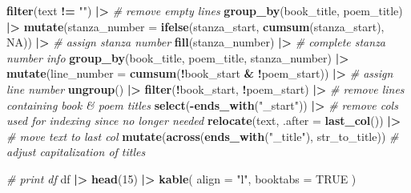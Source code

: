 \documentclass[
]{article}
\newenvironment{Shaded}{\begin{snugshade}}{\end{snugshade}}
\newcommand{\AttributeTok}[1]{\textcolor[rgb]{0.13,0.29,0.53}{#1}}
\newcommand{\CommentTok}[1]{\textcolor[rgb]{0.56,0.35,0.01}{\textit{#1}}}
\newcommand{\ConstantTok}[1]{\textcolor[rgb]{0.56,0.35,0.01}{#1}}
\newcommand{\DecValTok}[1]{\textcolor[rgb]{0.00,0.00,0.81}{#1}}
\newcommand{\FunctionTok}[1]{\textcolor[rgb]{0.13,0.29,0.53}{\textbf{#1}}}
\newcommand{\NormalTok}[1]{#1}
\newcommand{\SpecialCharTok}[1]{\textcolor[rgb]{0.81,0.36,0.00}{\textbf{#1}}}
\newcommand{\StringTok}[1]{\textcolor[rgb]{0.31,0.60,0.02}{#1}}
\begin{document}
\begin{Shaded}
\begin{Highlighting}[]
  \FunctionTok{filter}\NormalTok{(text }\SpecialCharTok{!=} \StringTok{""}\NormalTok{) }\SpecialCharTok{|\textgreater{}} \CommentTok{\# remove empty lines}
  \FunctionTok{group\_by}\NormalTok{(book\_title, poem\_title) }\SpecialCharTok{|\textgreater{}} 
  \FunctionTok{mutate}\NormalTok{(}\AttributeTok{stanza\_number =} \FunctionTok{ifelse}\NormalTok{(stanza\_start, }\FunctionTok{cumsum}\NormalTok{(stanza\_start), }\ConstantTok{NA}\NormalTok{)) }\SpecialCharTok{|\textgreater{}} \CommentTok{\# assign stanza number}
  \FunctionTok{fill}\NormalTok{(stanza\_number) }\SpecialCharTok{|\textgreater{}} \CommentTok{\# complete stanza number info}
  \FunctionTok{group\_by}\NormalTok{(book\_title, poem\_title, stanza\_number) }\SpecialCharTok{|\textgreater{}} 
  \FunctionTok{mutate}\NormalTok{(}\AttributeTok{line\_number =} \FunctionTok{cumsum}\NormalTok{(}\SpecialCharTok{!}\NormalTok{book\_start }\SpecialCharTok{\&} \SpecialCharTok{!}\NormalTok{poem\_start)) }\SpecialCharTok{|\textgreater{}} \CommentTok{\# assign line number}
  \FunctionTok{ungroup}\NormalTok{() }\SpecialCharTok{|\textgreater{}} 
  \FunctionTok{filter}\NormalTok{(}\SpecialCharTok{!}\NormalTok{book\_start, }\SpecialCharTok{!}\NormalTok{poem\_start) }\SpecialCharTok{|\textgreater{}} \CommentTok{\# remove lines containing book \& poem titles}
  \FunctionTok{select}\NormalTok{(}\SpecialCharTok{{-}}\FunctionTok{ends\_with}\NormalTok{(}\StringTok{"\_start"}\NormalTok{)) }\SpecialCharTok{|\textgreater{}}  \CommentTok{\# remove cols used for indexing since no longer needed}
  \FunctionTok{relocate}\NormalTok{(text, }\AttributeTok{.after =} \FunctionTok{last\_col}\NormalTok{()) }\SpecialCharTok{|\textgreater{}} \CommentTok{\# move text to last col}
  \FunctionTok{mutate}\NormalTok{(}\FunctionTok{across}\NormalTok{(}\FunctionTok{ends\_with}\NormalTok{(}\StringTok{"\_title"}\NormalTok{), str\_to\_title)) }\CommentTok{\# adjust capitalization of titles}

\CommentTok{\# print df}
\NormalTok{df }\SpecialCharTok{|\textgreater{}} 
  \FunctionTok{head}\NormalTok{(}\DecValTok{15}\NormalTok{) }\SpecialCharTok{|\textgreater{}} 
  \FunctionTok{kable}\NormalTok{(}
    \AttributeTok{align =} \StringTok{"l"}\NormalTok{,}
    \AttributeTok{booktabs =} \ConstantTok{TRUE}
\NormalTok{  ) }
\end{Highlighting}
\end{Shaded}
\end{document}
